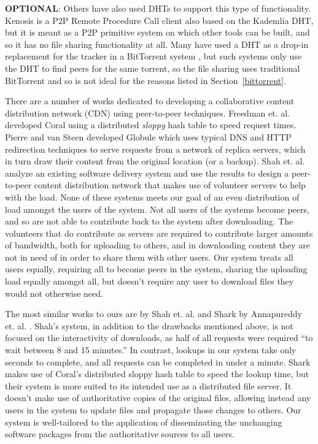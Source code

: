 \documentclass[conference]{IEEEtran}
\begin{document}
\textbf{OPTIONAL}: Others have also used DHTs to support this type of functionality.
Kenosis \cite{kenosis} is a P2P Remote Procedure Call
client also based on the Kademlia DHT, but it is meant as a P2P
primitive system on which other tools can be built, and so it has no
file sharing functionality at all. Many have used a DHT as a drop-in
replacement for the tracker in a BitTorrent system
\cite{bittorrent-dht, azureus-dht}, but such systems only use the
DHT to find peers for the same torrent, so the file sharing uses
traditional BitTorrent and so is not ideal for the reasons listed
in Section~\ref{bittorrent}.


There are a number of works dedicated to developing a collaborative
content distribution network (CDN) using peer-to-peer techniques.
Freedman et. al. developed Coral \cite{coral} using a distributed
\emph{sloppy} hash table to speed request times. Pierre and van
Steen developed Globule \cite{globule} which uses typical DNS and
HTTP redirection techniques to serve requests from a network of
replica servers, which in turn draw their content from the original
location (or a backup). Shah et. al. \cite{shah08} analyze an
existing software delivery system and use the results to design a
peer-to-peer content distribution network that makes use of
volunteer servers to help with the load. None of these systems meets
our goal of an even distribution of load amongst the users of the
system. Not all users of the systems become peers, and so are not
able to contribute back to the system after downloading. The
volunteers that do contribute as servers are required to contribute
larger amounts of bandwidth, both for uploading to others, and in
downloading content they are not in need of in order to share them
with other users. Our system treats all users equally, requiring all
to become peers in the system, sharing the uploading load equally
amongst all, but doesn't require any user to download files they
would not otherwise need.

The most similar works to ours are by Shah et. al. \cite{shah08} and
Shark by Annapureddy et. al. \cite{shark}.
Shah's system, in addition to the drawbacks mentioned above,
is not focused on the interactivity of downloads, as
half of all requests were required ``to wait between 8 and 15
minutes.'' In contrast, lookups in our system take only seconds to
complete, and all requests can be completed in under a minute.
Shark makes use of Coral's distributed sloppy hash table to speed
the lookup time, but their system is more suited to its intended use
as a distributed file server. It doesn't make use of authoritative
copies of the original files, allowing instead any users in the
system to update files and propagate those changes to others. Our
system is well-tailored to the application of disseminating the
unchanging software packages from the authoritative sources to all
users.
\end{document}
